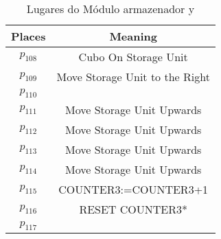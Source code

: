 \begin{table}[htbp]
\caption{Lugares do Módulo armazenador y}
\centering
\begin{tabular}{c|c}
Places & Meaning\\
\hline
\hyperlink{partialNet:p108}{\hypertarget{partialTable:p108}{$p_{108}$}} & Cubo On Storage Unit\\
\hyperlink{partialNet:p109}{\hypertarget{partialTable:p109}{$p_{109}$}} & Move Storage Unit to the Right\\
\hyperlink{partialNet:p110}{\hypertarget{partialTable:p110}{$p_{110}$}} & \\
\hyperlink{partialNet:p111}{\hypertarget{partialTable:p111}{$p_{111}$}} & Move Storage Unit Upwards\\
\hyperlink{partialNet:p112}{\hypertarget{partialTable:p112}{$p_{112}$}} & Move Storage Unit Upwards\\
\hyperlink{partialNet:p113}{\hypertarget{partialTable:p113}{$p_{113}$}} & Move Storage Unit Upwards\\
\hyperlink{partialNet:p114}{\hypertarget{partialTable:p114}{$p_{114}$}} & Move Storage Unit Upwards\\
\hyperlink{partialNet:p115}{\hypertarget{partialTable:p115}{$p_{115}$}} & COUNTER3:=COUNTER3+1\\
\hyperlink{partialNet:p116}{\hypertarget{partialTable:p116}{$p_{116}$}} & RESET COUNTER3*\\
\hyperlink{partialNet:p117}{\hypertarget{partialTable:p117}{$p_{117}$}} & \\
\end{tabular}
\end{table}


